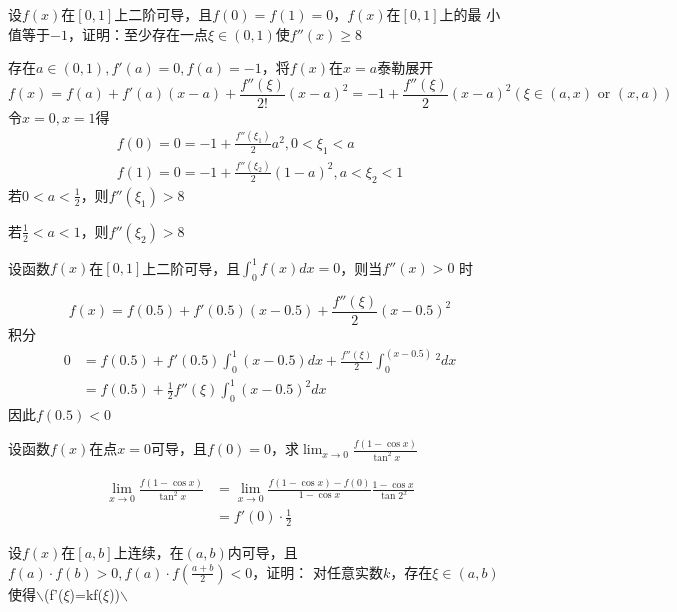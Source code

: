 \documentclass{article}
\begin{document}
\begin{examplle}[]
设\(f(x)\)在\([0,1]\)上二阶可导，且\(f(0)=f(1)=0\)，\(f(x)\)在\([0,1]\)上的最
小值等于\(-1\)，证明：至少存在一点\(\xi\in(0,1)\)使\(f''(x)\ge8\)

存在\(a\in(0,1),f'(a)=0,f(a)=-1\)，将\(f(x)\)在\(x=a\)泰勒展开
\begin{equation*}
f(x)=f(a)+f'(a)(x-a)+\frac{f''(\xi)}{2!}(x-a)^2=-1+\frac{f''(\xi)}{2}(x-a)^2(\xi\in(a,x)\text{ or }(x,a))
\end{equation*}
令\(x=0,x=1\)得
\begin{gather*}
f(0)=0=-1+\frac{f''(\xi_1)}{2}a^2,0<\xi_1<a\\
f(1)=0=-1+\frac{f''(\xi_2)}{2}(1-a)^2,a<\xi_2<1
\end{gather*}
若\(0<a<\frac{1}{2}\)，则\(f''(\xi_1)>8\)


若\(\frac{1}{2}<a<1\)，则\(f''(\xi_2)>8\)
\end{examplle}

\begin{examplle}[]
设函数\(f(x)\)在\([0,1]\)上二阶可导，且\(\int_0^1f(x)dx=0\)，则当\(f''(x)>0\)
时

\begin{equation*}
f(x)=f(0.5)+f'(0.5)(x-0.5)+\frac{f''(\xi)}{2}(x-0.5)^2
\end{equation*}
积分
\begin{align*}
0&=f(0.5)+f'(0.5)\int_0^1(x-0.5)dx+\frac{f''(\xi)}{2}\int_0^(x-0.5)^2dx\\
&=f(0.5)+\frac{1}{2}f''(\xi)\int_0^1(x-0.5)^2dx
\end{align*}
因此\(f(0.5)<0\)
\end{examplle}

\begin{examplle}[]
设函数\(f(x)\)在点\(x=0\)可导，且\(f(0)=0\)，求\(\lim_{x\to0}\frac{f(1-\cos
  x)}{\tan^2x}\)

\begin{align*}
\lim_{x\to0}\frac{f(1-\cos
x)}{\tan^2x}&=
\lim_{x\to0}\frac{f(1-\cos x)-f(0)}{1-\cos x}\frac{1-\cos x}{\tan2^x}\\
&=f'(0)\cdot\frac{1}{2}
\end{align*}
\end{examplle}

\begin{examplle}[]
设\(f(x)\)在\([a,b]\)上连续，在\((a,b)\)内可导，且\(f(a)\cdot f(b)>0,f(a)\cdot
  f(\frac{a+b}{2})<0\)，证明： 对任意实数\(k\)，存在\(\xi\in(a,b)\)使得$\backslash$(f'(\(\xi\))=kf(\(\xi\)))$\backslash$
\end{examplle}
\end{document}
